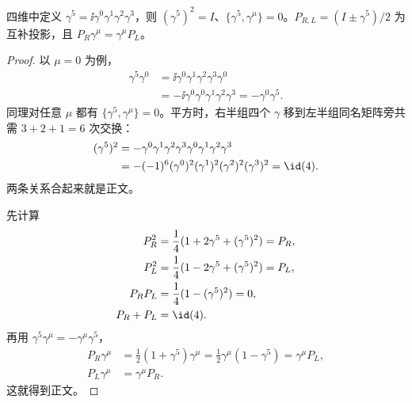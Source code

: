 \begin{lemma}[手征投影的代数]
四维中定义 $\gamma^5=\ii\gamma^0\gamma^1\gamma^2\gamma^3$，则 $(\gamma^5)^2=I$、$\{\gamma^5,\gamma^\mu\}=0$。$P_{R,L}=(I\pm\gamma^5)/2$ 为互补投影，且 $P_R\gamma^\mu=\gamma^\mu P_L$。
\end{lemma}
\begin{proof}
以 $\mu=0$ 为例，
\begin{align*}
 \gamma^5\gamma^0
 &=\ii\gamma^0\gamma^1\gamma^2\gamma^3\gamma^0\\
 &=-\ii\gamma^0\gamma^0\gamma^1\gamma^2\gamma^3
 =-\gamma^0\gamma^5.
\end{align*}
同理对任意 $\mu$ 都有 $\{\gamma^5,\gamma^\mu\}=0$。平方时，右半组四个 $\gamma$ 移到左半组同名矩阵旁共需 $3+2+1=6$ 次交换：
\begin{align*}
 (\gamma^5)^2
 &=-\gamma^0\gamma^1\gamma^2\gamma^3
 \gamma^0\gamma^1\gamma^2\gamma^3\\
 &=-(-1)^6(\gamma^0)^2(\gamma^1)^2(\gamma^2)^2(\gamma^3)^2
 =\id(4).
\end{align*}
两条关系合起来就是正文。

先计算
\begin{align*}
 P_R^2&=\frac14(1+2\gamma^5+(\gamma^5)^2)=P_R,\\
 P_L^2&=\frac14(1-2\gamma^5+(\gamma^5)^2)=P_L,\\
 P_RP_L&=\frac14(1-(\gamma^5)^2)=0,\\
 P_R+P_L&=\id(4).
\end{align*}
再用 $\gamma^5\gamma^\mu=-\gamma^\mu\gamma^5$，
\begin{align*}
 P_R\gamma^\mu
 &=\frac12(1+\gamma^5)\gamma^\mu
 =\frac12\gamma^\mu(1-\gamma^5)
 =\gamma^\mu P_L,\\
 P_L\gamma^\mu&=\gamma^\mu P_R.
\end{align*}
这就得到正文。
\end{proof}


